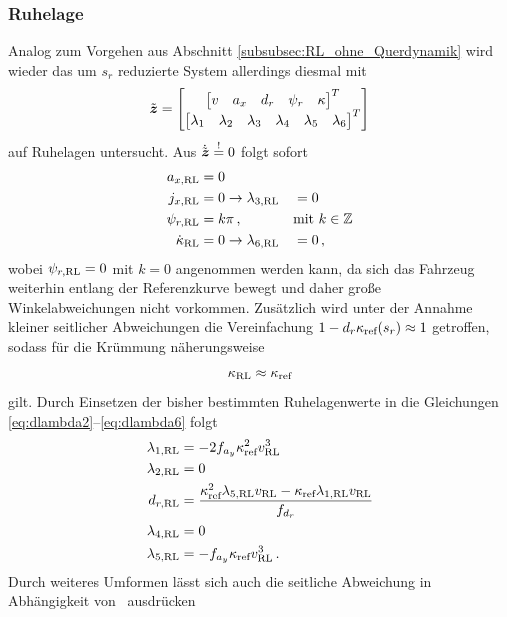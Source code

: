 \subsubsection{Ruhelage}\label{subsubsec:Ruhelage_Kreisfahrt_mit_Querdynamik}
Analog zum Vorgehen aus Abschnitt \ref{subsubsec:RL_ohne_Querdynamik} wird wieder das um $s_r$ reduzierte System allerdings diesmal mit
\begin{equation}
\tilde{\boldsymbol{z}} = 
\begin{bmatrix}
\begin{bmatrix}
v & a_x & d_r & \psi_r & \kappa
\end{bmatrix}^T\\
\begin{bmatrix}
\lambda_1 & \lambda_2 & \lambda_3 & \lambda_4 & \lambda_5 & \lambda_6
\end{bmatrix}^T
\end{bmatrix}
\end{equation}
auf Ruhelagen untersucht. Aus $\dot{\tilde{\boldsymbol{z}}} \stackrel{!}{=} 0$ folgt sofort 
\begin{alignat}{2}
	a_{x,\textrm{RL}} &= 0 &&\\
	j_{x,\textrm{RL}} &= 0 \rightarrow \lambda_{3,\textrm{RL}} &&= 0\\
	\psi_{r,\textrm{RL}} &= k\pi\,,&&\textrm{mit}~k\in\mathbb{Z}\\
	\dot{\kappa}_{\textrm{RL}} &= 0 \rightarrow \lambda_{6,\textrm{RL}} &&= 0\,,
\end{alignat}
wobei $\psi_{r,\textrm{RL}}=0$ mit $k=0$ angenommen werden kann, da sich das Fahrzeug weiterhin entlang der Referenzkurve bewegt und daher große Winkelabweichungen nicht vorkommen. Zusätzlich wird unter der Annahme kleiner seitlicher Abweichungen die Vereinfachung $1-d_r\kappa_{\textrm{ref}}(s_r)\approx 1$ getroffen, sodass für die Krümmung näherungsweise 
\begin{equation}
	\kappa_{\textrm{RL}} \approx \kappa_{\textrm{ref}} \label{eq:kappaRL_approx_kapparef}
\end{equation}
gilt. Durch Einsetzen der bisher bestimmten Ruhelagenwerte in die Gleichungen \eqref{eq:dlambda2}--\eqref{eq:dlambda6} folgt 
\begin{align}
	\lambda_{1,\textrm{RL}} &= -2f_{a_y}\kappa_{\textrm{ref}}^2v_{\textrm{RL}}^3\\
	\lambda_{2,\textrm{RL}} &= 0\\
	d_{r,\textrm{RL}} &= \frac{\kappa_{\textrm{ref}}^2\lambda_{5,\textrm{RL}} v_{\textrm{RL}}-\kappa_{\textrm{ref}}\lambda_{1,\textrm{RL}}v_{\textrm{RL}}}{f_{d_r}} \label{eq:dr_RL}\\
	\lambda_{4,\textrm{RL}} &= 0\\
	\lambda_{5,\textrm{RL}} &= -f_{a_y}\kappa_{\textrm{ref}} v_{\textrm{RL}}^3\,.
\end{align}
Durch weiteres Umformen lässt sich auch die seitliche Abweichung in Abhängigkeit von \vRL~ausdrücken
